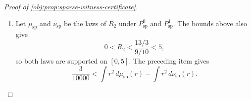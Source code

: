 \documentclass[11pt]{article}
\begin{document}
\begin{proof}[Proof of \cref{obj:prop:sparse-witness-certificate}]
\begin{enumerate}
For \(\tau\in[-1/10,1/10]\), set
\[
\Omega_\tau(y)
=
\frac{\mathfrak q(y)^2}{(1+\tau h(y))^2}.
\]
The elementary exponential bounds
\[
13<\exp(4)<55
\]
imply
\[
\frac{2}{27}<\frac4{\exp(4)-1},\qquad
\Omega_\tau(y)>\frac4{729}\frac{100}{121}.
\]
Moreover
\[
\frac{d}{dy}\log\Omega_\tau(y)
=
8-\frac{4\tau}{1+\tau h(y)}
\ge \frac{68}{9},
\]
so
\[
\frac{68}{9}\frac4{729}\frac{100}{121}
\le \Omega_\tau'(y).
\]
Integrating this derivative bound from \(1/2\) to \(y\), with the direction reversed when \(y<1/2\), gives
\[
\frac{68}{9}\frac4{729}\frac{100}{121}
\cdot 2\Bigl(y-\frac12\Bigr)^2
\le
h(y)\{\Omega_\tau(y)-\Omega_\tau(1/2)\}.
\]
After integration over \(y\in[0,1]\), using \(\int_0^1 h(y)\,dy=0\) and
\[
\int_0^1 2\Bigl(y-\frac12\Bigr)^2\,dy=\frac16,
\]
we obtain
\[
\frac16\frac{68}{9}\frac4{729}\frac{100}{121}
\le
\int_0^1 h(y)\Omega_\tau(y)\,dy.
\]
Since
\[
A_{\mathrm{sp}}'(x)
=
-\frac15\int_0^1 h(y)\Omega_{h(x)/10}(y)\,dy,
\]
and \(H'(x)=\mathfrak q(x)-1\) with \(H(0)=H(1)=0\), integration by parts yields
\[
\int_0^1 \{1-\mathfrak q(x)\}A_{\mathrm{sp}}(x)\,dx
=
\int_0^1 H(x)A_{\mathrm{sp}}'(x)\,dx
\ge
\frac1{30}\frac{68}{9}\frac4{729}\frac{100}{121}
\int_0^1\{-H(x)\}\,dx .
\]
The last integral is
\[
\int_0^1\{-H(x)\}\,dx
=
\frac1{1-\exp(-4)}-\frac34
>
\frac{29}{108}.
\]
Therefore
\[
\int R_2^2\,dP^0_{\mathrm{sp}}
-
\int R_2^2\,dP^1_{\mathrm{sp}}
>
\frac1{30}\frac{68}{9}\frac4{729}\frac{100}{121}\frac{29}{108}
=
\frac{19720}{64304361}
>
\frac3{10000}.
\]

\item Let \(\mu_{\mathrm{sp}}\) and \(\nu_{\mathrm{sp}}\) be the laws of \(R_2\) under \(P^0_{\mathrm{sp}}\) and \(P^1_{\mathrm{sp}}\).  The bounds above also give
\[
0<R_2<\frac{13/3}{9/10}<5,
\]
so both laws are supported on \([0,5]\).  The preceding item gives
\[
\frac3{10000}
<
\int r^2\,d\mu_{\mathrm{sp}}(r)-\int r^2\,d\nu_{\mathrm{sp}}(r).
\]


\end{enumerate}
\end{proof}
\end{document}
